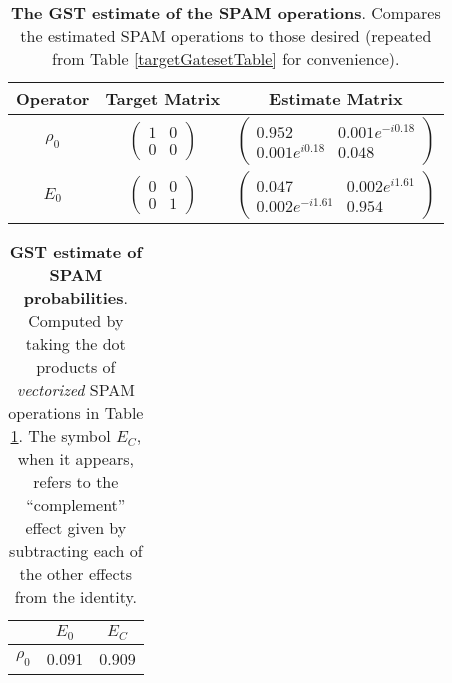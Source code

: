 \documentclass{article}[11pt]
\begin{document}
\begin{table}[h]
\begin{center}
\begin{tabular}[l]{|c|c|c|}
\hline
Operator & Target Matrix & Estimate Matrix \\ \hline
$\rho_{0}$ & $ \left(\!\!\begin{array}{cc}
1 & 0 \\ 
0 & 0
 \end{array}\!\!\right) $
 & $ \left(\!\!\begin{array}{cc}
0.952 & 0.001e^{-i0.18} \\ 
0.001e^{i0.18} & 0.048
 \end{array}\!\!\right) $
 \\ \hline
$E_{0}$ & $ \left(\!\!\begin{array}{cc}
0 & 0 \\ 
0 & 1
 \end{array}\!\!\right) $
 & $ \left(\!\!\begin{array}{cc}
0.047 & 0.002e^{i1.61} \\ 
0.002e^{-i1.61} & 0.954
 \end{array}\!\!\right) $
 \\ \hline
\end{tabular}

\caption{\textbf{The GST estimate of the SPAM operations}.  Compares the estimated SPAM operations to those desired (repeated from Table \ref{targetGatesetTable} for convenience).\label{bestGatesetSpamTable}}
\end{center}
\end{table}

\begin{table}[h]
\begin{center}
\begin{tabular}[l]{|c|c|c|}
\hline
 & $E_{0}$ & $E_C$ \\ \hline
$\rho_{0}$ & 0.091 & 0.909 \\ \hline
\end{tabular}

\caption{\textbf{GST estimate of SPAM probabilities}.  Computed by taking the dot products of \emph{vectorized} SPAM operations in Table \ref{bestGatesetSpamTable}.  The symbol $E_C$, when it appears, refers to the ``complement'' effect given by subtracting each of the other effects from the identity.\label{bestGatesetSpamParametersTable}}
\end{center}
\end{table}
\end{document}
